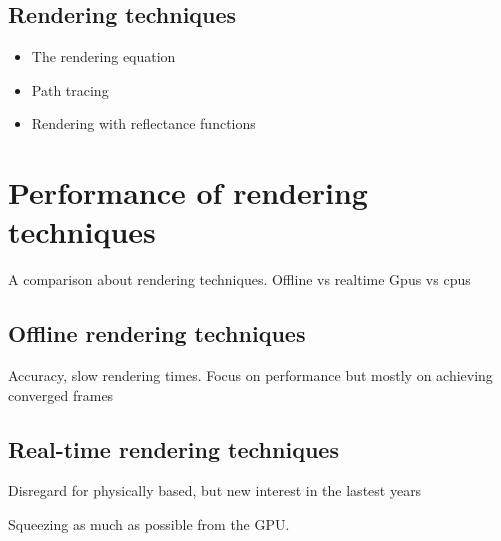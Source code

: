 \subsection{Rendering techniques}
\begin{itemize}
\item The rendering equation
\item Path tracing
\item Rendering with reflectance functions
\end{itemize}

\section{Performance of rendering techniques} 

A comparison about rendering techniques. Offline vs realtime
Gpus vs cpus


\subsection{Offline rendering techniques}
Accuracy, slow rendering times. Focus on performance but mostly on achieving converged frames

\subsection{Real-time rendering techniques}
Disregard for physically based, but new interest in the lastest years

Squeezing as much as possible from the GPU. 



